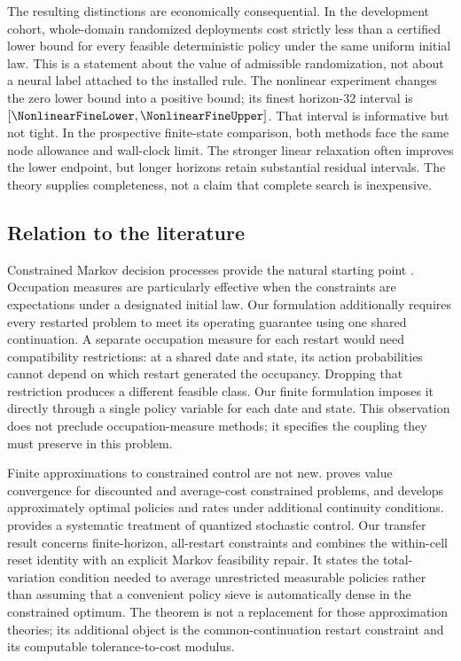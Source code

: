 The resulting distinctions are economically consequential. In the development cohort, \PrimaryStrict{} whole-domain randomized deployments cost strictly less than a certified lower bound for every feasible deterministic policy under the same uniform initial law. This is a statement about the value of admissible randomization, not about a neural label attached to the installed rule. The nonlinear experiment changes the zero lower bound into a positive bound; its finest horizon-32 interval is $[\NonlinearFineLower,\NonlinearFineUpper]$. That interval is informative but not tight. In the prospective finite-state comparison, both methods face the same node allowance and wall-clock limit. The stronger linear relaxation often improves the lower endpoint, but longer horizons retain substantial residual intervals. The theory supplies completeness, not a claim that complete search is inexpensive.

\subsection{Relation to the literature}\label{sec:literature}
Constrained Markov decision processes provide the natural starting point \citep{Altman1999}. Occupation measures are particularly effective when the constraints are expectations under a designated initial law. Our formulation additionally requires every restarted problem to meet its operating guarantee using one shared continuation. A separate occupation measure for each restart would need compatibility restrictions: at a shared date and state, its action probabilities cannot depend on which restart generated the occupancy. Dropping that restriction produces a different feasible class. Our finite formulation imposes it directly through a single policy variable for each date and state. This observation does not preclude occupation-measure methods; it specifies the coupling they must preserve in this problem.

Finite approximations to constrained control are not new. \citet{Saldi2018} proves value convergence for discounted and average-cost constrained problems, and develops approximately optimal policies and rates under additional continuity conditions. \citet{SaldiLinderYuksel2018} provides a systematic treatment of quantized stochastic control. Our transfer result concerns finite-horizon, all-restart constraints and combines the within-cell reset identity with an explicit Markov feasibility repair. It states the total-variation condition needed to average unrestricted measurable policies rather than assuming that a convenient policy sieve is automatically dense in the constrained optimum. The theorem is not a replacement for those approximation theories; its additional object is the common-continuation restart constraint and its computable tolerance-to-cost modulus.

